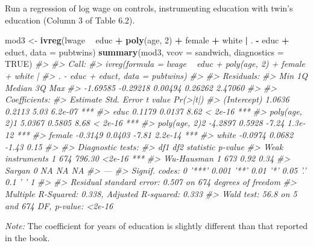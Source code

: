 \documentclass[]{book}
\newenvironment{Shaded}{\begin{snugshade}}{\end{snugshade}}
\newcommand{\KeywordTok}[1]{\textcolor[rgb]{0.13,0.29,0.53}{\textbf{#1}}}
\newcommand{\DataTypeTok}[1]{\textcolor[rgb]{0.13,0.29,0.53}{#1}}
\newcommand{\DecValTok}[1]{\textcolor[rgb]{0.00,0.00,0.81}{#1}}
\newcommand{\StringTok}[1]{\textcolor[rgb]{0.31,0.60,0.02}{#1}}
\newcommand{\CommentTok}[1]{\textcolor[rgb]{0.56,0.35,0.01}{\textit{#1}}}
\newcommand{\OtherTok}[1]{\textcolor[rgb]{0.56,0.35,0.01}{#1}}
\newcommand{\OperatorTok}[1]{\textcolor[rgb]{0.81,0.36,0.00}{\textbf{#1}}}
\newcommand{\NormalTok}[1]{#1}
\theoremstyle{definition}
\theoremstyle{definition}
\theoremstyle{definition}
\theoremstyle{remark}
\begin{document}
Run a regression of log wage on controls, instrumenting education with
twin's education (Column 3 of Table 6.2).

\begin{Shaded}
\begin{Highlighting}[]
\NormalTok{mod3 <-}\StringTok{ }\KeywordTok{ivreg}\NormalTok{(lwage }\OperatorTok{~}\StringTok{ }\NormalTok{educ }\OperatorTok{+}\StringTok{ }\KeywordTok{poly}\NormalTok{(age, }\DecValTok{2}\NormalTok{) }\OperatorTok{+}\StringTok{ }\NormalTok{female }\OperatorTok{+}\StringTok{ }\NormalTok{white }\OperatorTok{|}
\StringTok{                }\NormalTok{. }\OperatorTok{-}\StringTok{ }\NormalTok{educ }\OperatorTok{+}\StringTok{ }\NormalTok{educt, }\DataTypeTok{data =}\NormalTok{ pubtwins)}
\KeywordTok{summary}\NormalTok{(mod3, }\DataTypeTok{vcov =}\NormalTok{ sandwich, }\DataTypeTok{diagnostics =} \OtherTok{TRUE}\NormalTok{)}
\CommentTok{#> }
\CommentTok{#> Call:}
\CommentTok{#> ivreg(formula = lwage ~ educ + poly(age, 2) + female + white | }
\CommentTok{#>     . - educ + educt, data = pubtwins)}
\CommentTok{#> }
\CommentTok{#> Residuals:}
\CommentTok{#>      Min       1Q   Median       3Q      Max }
\CommentTok{#> -1.69585 -0.29218  0.00494  0.26262  2.47060 }
\CommentTok{#> }
\CommentTok{#> Coefficients:}
\CommentTok{#>               Estimate Std. Error t value Pr(>|t|)    }
\CommentTok{#> (Intercept)     1.0636     0.2113    5.03  6.2e-07 ***}
\CommentTok{#> educ            0.1179     0.0137    8.62  < 2e-16 ***}
\CommentTok{#> poly(age, 2)1   5.0367     0.5805    8.68  < 2e-16 ***}
\CommentTok{#> poly(age, 2)2  -4.2897     0.5928   -7.24  1.3e-12 ***}
\CommentTok{#> female         -0.3149     0.0403   -7.81  2.2e-14 ***}
\CommentTok{#> white          -0.0974     0.0682   -1.43     0.15    }
\CommentTok{#> }
\CommentTok{#> Diagnostic tests:}
\CommentTok{#>                  df1 df2 statistic p-value    }
\CommentTok{#> Weak instruments   1 674    796.30  <2e-16 ***}
\CommentTok{#> Wu-Hausman         1 673      0.92    0.34    }
\CommentTok{#> Sargan             0  NA        NA      NA    }
\CommentTok{#> ---}
\CommentTok{#> Signif. codes:  0 '***' 0.001 '**' 0.01 '*' 0.05 '.' 0.1 ' ' 1}
\CommentTok{#> }
\CommentTok{#> Residual standard error: 0.507 on 674 degrees of freedom}
\CommentTok{#> Multiple R-Squared: 0.338,   Adjusted R-squared: 0.333 }
\CommentTok{#> Wald test: 56.8 on 5 and 674 DF,  p-value: <2e-16}
\end{Highlighting}
\end{Shaded}

\emph{Note:} The coefficient for years of education is slightly
different than that reported in the book.
\end{document}
